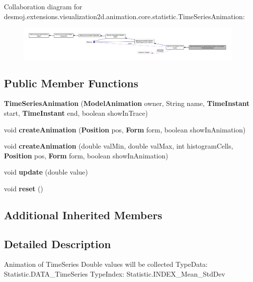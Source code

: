 Collaboration diagram for desmoj.\-extensions.\-visualization2d.\-animation.\-core.\-statistic.\-Time\-Series\-Animation\-:
\nopagebreak
\begin{figure}[H]
\begin{center}
\leavevmode
\includegraphics[width=350pt]{classdesmoj_1_1extensions_1_1visualization2d_1_1animation_1_1core_1_1statistic_1_1_time_series_animation__coll__graph}
\end{center}
\end{figure}
\subsection*{Public Member Functions}
\begin{DoxyCompactItemize}
\item 
{\bf Time\-Series\-Animation} ({\bf Model\-Animation} owner, String name, {\bf Time\-Instant} start, {\bf Time\-Instant} end, boolean show\-In\-Trace)
\item 
void {\bf create\-Animation} ({\bf Position} pos, {\bf Form} form, boolean show\-In\-Animation)
\item 
void {\bf create\-Animation} (double val\-Min, double val\-Max, int histogram\-Cells, {\bf Position} pos, {\bf Form} form, boolean show\-In\-Animation)
\item 
void {\bf update} (double value)
\item 
void {\bfseries reset} ()\label{classdesmoj_1_1extensions_1_1visualization2d_1_1animation_1_1core_1_1statistic_1_1_time_series_animation_a17f3bf7911984ce9d2e333b1eaf85a99}

\end{DoxyCompactItemize}
\subsection*{Additional Inherited Members}


\subsection{Detailed Description}
Animation of Time\-Series Double values will be collected Type\-Data\-: Statistic.\-D\-A\-T\-A\-\_\-\-Time\-Series Type\-Index\-: Statistic.\-I\-N\-D\-E\-X\-\_\-\-Mean\-\_\-\-Std\-Dev

